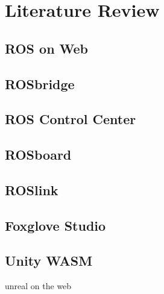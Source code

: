 \chapter{Literature Review}\label{cha:literature}


\section{ROS on Web}\label{sec:ros_on_web}

\section{ROSbridge}\label{sec:rosbridge}

\section{ROS Control Center}\label{sec:roscontrol}

\section{ROSboard}\label{sec:rosboard}

\section{ROSlink}\label{sec:roslink}

\section{Foxglove Studio}\label{sec:foxglove}

\section{Unity WASM}

unreal on the web